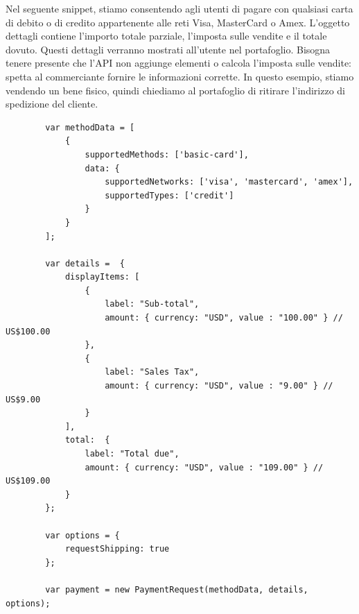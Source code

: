\documentclass[italian]{article}
\begin{document}
	\begin{flushleft}
		Nel seguente snippet, stiamo consentendo agli utenti di pagare con qualsiasi carta di debito o di credito appartenente alle reti Visa, MasterCard o Amex. L'oggetto dettagli contiene l'importo totale parziale, l'imposta sulle vendite e il totale dovuto. Questi dettagli verranno mostrati all'utente nel portafoglio. Bisogna tenere presente che l'API non aggiunge elementi o calcola l'imposta sulle vendite: spetta al commerciante fornire le informazioni corrette. In questo esempio, stiamo vendendo un bene fisico, quindi chiediamo al portafoglio di ritirare l'indirizzo di spedizione del cliente.
	\end{flushleft}
	\pagebreak
	\begin{lstlisting}
		var methodData = [
			{     
				supportedMethods: ['basic-card'],     
				data: {          
					supportedNetworks: ['visa', 'mastercard', 'amex'],
					supportedTypes: ['credit']                 
				}    
			}     
		];
		
		var details =  {
			displayItems: [
				{
					label: "Sub-total",
					amount: { currency: "USD", value : "100.00" } // US$100.00
				},
				{
					label: "Sales Tax",
					amount: { currency: "USD", value : "9.00" } // US$9.00
				}
			],
			total:  {
				label: "Total due",
				amount: { currency: "USD", value : "109.00" } // US$109.00
			}
		};
			
		var options = {
			requestShipping: true 
		};
		
		var payment = new PaymentRequest(methodData, details, options);
	\end{lstlisting}
	
\end{document}
